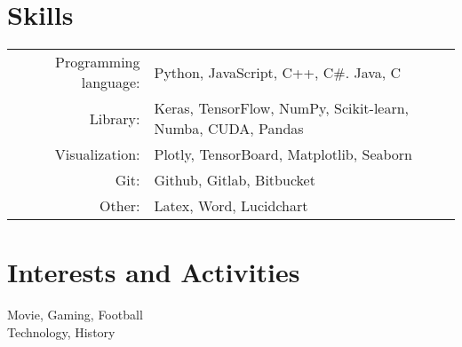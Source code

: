 \documentclass[a4paper,10pt]{article}
\begin{document}
\section{Skills}
\begin{tabular}{rp{11cm}}
	Programming language: & Python, JavaScript, C++, C\#. Java, C \\
	Library: & Keras, TensorFlow, NumPy, Scikit-learn, Numba, CUDA, Pandas \\	
	Visualization: & Plotly, TensorBoard, Matplotlib, Seaborn \\
	Git:        & Github, Gitlab, Bitbucket \\
	Other: 			& Latex, Word, Lucidchart \\
\end{tabular}

\section{Interests and Activities}
Movie, Gaming, Football \\
Technology, History\\
\end{document}
